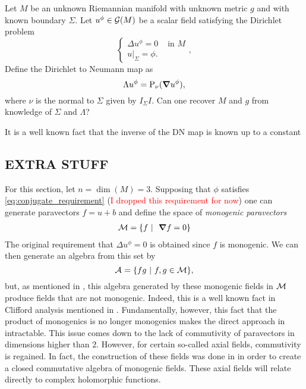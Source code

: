 \begin{question}
Let $M$ be an unknown Riemannian manifold with unknown metric $g$ and with known boundary $\Sigma$.  Let $u^\phi \in \mathcal{G}(M)$ be a scalar field satisfying the Dirichlet problem
\begin{equation}
\label{eq:dirichlet_problem_multivector}
\begin{cases} \Delta u^\phi = 0 & \textrm{ in $M$} \\  u\vert_\Sigma = \phi. \end{cases},
\end{equation}
Define the Dirichlet to Neumann map as
\[
\Lambda u^\phi = \operatorname{P}_{\nu}(\boldsymbol{\nabla} u^\phi),
\]
where $\nu$ is the normal to $\Sigma$ given by $I_\Sigma I$.  Can one recover $M$ and $g$ from knowledge of $\Sigma$ and $\Lambda$?
\end{question}

It is a well known fact that the inverse of the DN map is known up to a constant

\subsection{EXTRA STUFF}


For this section, let $n=\dim(M)=3$. Supposing that $\phi$ satisfies \ref{eq:conjugate_requirement} (\textcolor{red}{I dropped this requirement for now}) one can generate paravectors $f=u+b$ and define the space of \emph{monogenic paravectors}
\begin{align*}
\mathcal{M} &= \{ f ~ \vert ~ ~\boldsymbol{\nabla} f=0\}\\
\end{align*}
The original requirement that $\Delta u^\phi =0$ is obtained since $f$ is monogenic. We can then generate an algebra from this set by
\[
\mathcal{A}_{} = \{ fg ~\vert~ f,g \in \mathcal{M}\},
\]
but, as mentioned in \cite{belishev_algebras_2019}, this algebra generated by these monogenic fields in $\mathcal{M}$ produce fields that are not monogenic.  Indeed, this is a well known fact in Clifford analysis mentioned in \cite{schepper_introductory_nodate}.  Fundamentally, however, this fact that the product of monogenics is no longer monogenics makes the direct approach in \cite{belishev_calderon_2003} intractable. This issue comes down to the lack of commutivity of paravectors in dimensions higher than $2$.  However, for certain so-called axial fields, commutivity is regained. In fact, the construction of these fields was done in \cite{belishev_algebras_2017} in order to create a closed commutative algebra of monogenic fields. These axial fields will relate directly to complex holomorphic functions.

